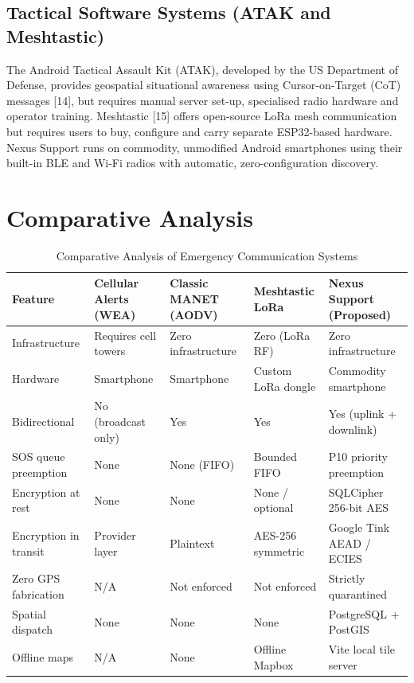 \documentclass[12pt,a4paper]{report}
\begin{document}
\subsection{Tactical Software Systems (ATAK and Meshtastic)}
The Android Tactical Assault Kit (ATAK), developed by the US Department of Defense, provides geospatial situational awareness using Cursor-on-Target (CoT) messages [14], but requires manual server set-up, specialised radio hardware and operator training. Meshtastic [15] offers open-source LoRa mesh communication but requires users to buy, configure and carry separate ESP32-based hardware. Nexus Support runs on commodity, unmodified Android smartphones using their built-in BLE and Wi-Fi radios with automatic, zero-configuration discovery.

\section{Comparative Analysis}

\begin{table}[htbp]
\centering
\small
\caption{Comparative Analysis of Emergency Communication Systems}
\label{tab:lit_comparison}
\renewcommand{\arraystretch}{1.3}
\begin{tabularx}{\textwidth}{|>{\raggedright\arraybackslash}p{2.5cm}|>{\raggedright\arraybackslash}X|>{\raggedright\arraybackslash}X|>{\raggedright\arraybackslash}X|>{\raggedright\arraybackslash}X|}
\hline
\textbf{Feature} & \textbf{Cellular Alerts (WEA)} & \textbf{Classic MANET (AODV)} & \textbf{Meshtastic LoRa} & \textbf{Nexus Support (Proposed)} \\
\hline
Infrastructure & Requires cell towers & Zero infrastructure & Zero (LoRa RF) & Zero infrastructure \\
\hline
Hardware & Smartphone & Smartphone & Custom LoRa dongle & Commodity smartphone \\
\hline
Bidirectional & No (broadcast only) & Yes & Yes & Yes (uplink + downlink) \\
\hline
SOS queue preemption & None & None (FIFO) & Bounded FIFO & P10 priority preemption \\
\hline
Encryption at rest & None & None & None / optional & SQLCipher 256-bit AES \\
\hline
Encryption in transit & Provider layer & Plaintext & AES-256 symmetric & Google Tink AEAD / ECIES \\
\hline
Zero GPS fabrication & N/A & Not enforced & Not enforced & Strictly quarantined \\
\hline
Spatial dispatch & None & None & None & PostgreSQL + PostGIS \\
\hline
Offline maps & N/A & None & Offline Mapbox & Vite local tile server \\
\hline
\end{tabularx}
\end{table}
\end{document}

